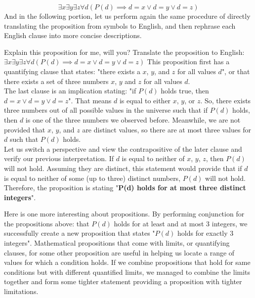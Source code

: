 \[\exists x \exists y \exists z \forall d (P(d) \implies d = x \lor d = y \lor d = z)\]
And in the following portion, let us perform again the same procedure of directly translating the proposition from symbols to English, and then rephrase each English clause into more concise descriptions.
\begin{ln-think}{Explain this proposition for me, will you?}{}
    Translate the proposition to English: $\exists x \exists y \exists z \forall d (P(d) \implies d = x \lor d = y \lor d = z)$
    \tcblower
    This proposition first has a quantifying clause that states: "there exists a $x$, $y$, and $z$ for all values $d$", or that there exists a set of three numbers $x$, $y$ and $z$ for all values $d$. \\
    The last clause is an implication stating: "if $P(d)$ holds true, then $d = x \lor d = y \lor d = z$". That means $d$ is equal to either $x$, $y$, or $z$. So, there exists three numbers out of all possible values in the universe such that if $P(d)$ holds, then $d$ is one of the three numbers we observed before. Meanwhile, we are not provided that $x$, $y$, and $z$ are distinct values, so there are at most three values for $d$ such that $P(d)$ holds.\\
    Let us switch a perspective and view the contrapositive of the later clause and verify our previous interpretation. If $d$ is equal to neither of $x$, $y$, $z$, then $P(d)$ will not hold. Assuming they are distinct, this statement would provide that if $d$ is equal to neither of some (up to three) distinct numbers, $P(d)$ will not hold. \\
    Therefore, the proposition is stating "\textbf{P(d) holds for at most three distinct integers}".
\end{ln-think}
Here is one more interesting about propositions. By performing conjunction for the propositions above: that $P(d)$ holds for at least and at most 3 integers, we successfully create a new proposition that states "$P(d)$ holds for exactly 3 integers". Mathematical propositions that come with limits, or quantifying clauses, for some other proposition are useful in helping us locate a range of values for which a condition holds. If we combine propositions that hold for same conditions but with different quantified limits, we managed to combine the limits together and form some tighter statement providing a proposition with tighter limitations.
